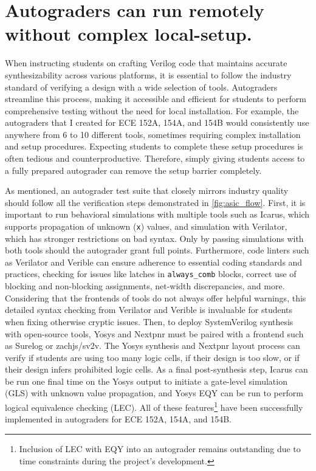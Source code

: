 \section{Autograders can run remotely without complex local-setup.}
\label{section:complex_tool_setups}

When instructing students on crafting Verilog code that maintains accurate synthesizability across various platforms, it is essential to follow the industry standard of verifying a design with a wide selection of tools.
Autograders streamline this process, making it accessible and efficient for students to perform comprehensive testing without the need for local installation.
For example, the autograders that I created for ECE 152A, 154A, and 154B would consistently use anywhere from 6 to 10 different tools, sometimes requiring complex installation and setup procedures.
Expecting students to complete these setup procedures is often tedious and counterproductive.
Therefore, simply giving students access to a fully prepared autograder can remove the setup barrier completely.

As mentioned, an autograder test suite that closely mirrors industry quality should follow all the verification steps demonstrated in \autoref{fig:asic_flow}.
First, it is important to run behavioral simulations with multiple tools such as Icarus, which supports propagation of unknown (\texttt{x}) values, and simulation with Verilator, which has stronger restrictions on bad syntax.
Only by passing simulations with both tools should the autograder grant full points.
Furthermore, code linters such as Verilator and Verible can ensure adherence to essential coding standards and practices, checking for issues like latches in \texttt{always_comb} blocks, correct use of blocking and non-blocking assignments, net-width discrepancies, and more.
Considering that the frontends of tools do not always offer helpful warnings, this detailed syntax checking from Verilator and Verible is invaluable for students when fixing otherwise cryptic issues.
Then, to deploy SystemVerilog synthesis with open-source tools, Yosys and Nextpnr must be paired with a frontend such as Surelog or zachjs/sv2v.
The Yosys synthesis and Nextpnr layout process can verify if students are using too many logic cells, if their design is too slow, or if their design infers prohibited logic cells.
As a final post-synthesis step, Icarus can be run one final time on the Yosys output to initiate a gate-level simulation (GLS) with unknown value propagation, and Yosys EQY can be run to perform logical equivalence checking (LEC).
All of these features\footnote{Inclusion of LEC with EQY into an autograder remains outstanding due to time constraints during the project's development.} have been successfully implemented in autograders for ECE 152A, 154A, and 154B.

